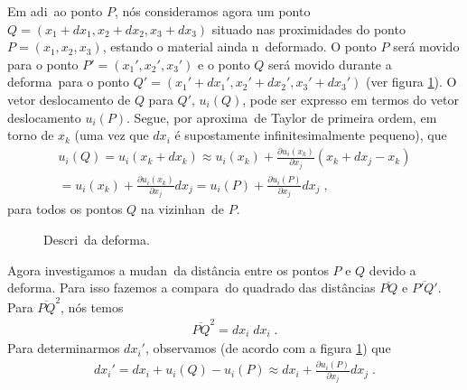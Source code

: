 Em adi\cao\ ao ponto $P$, n\'os consideramos agora um ponto
$Q=(x_1+dx_1,x_2+dx_2,x_3+dx_3)$ situado nas proximidades do
ponto $P=(x_1,x_2,x_3)$, estando o material ainda n\ao\ deformado. O
ponto $P$ ser\'a movido para o ponto $P'=(x_1',x_2',x_3')$ e o ponto
$Q$ ser\'a movido durante a deforma\cao\ para o ponto
$Q'=(x_1'+dx_1',x_2'+dx_2',x_3'+dx_3')$ (ver figura \ref{fig:tensor-deformacao}). O vetor
deslocamento de $Q$ para $Q'$, $u_i(Q)$, pode ser expresso em termos do
vetor deslocamento $u_i(P)$. Segue, por aproxima\cao\ de Taylor de
primeira ordem, em torno de $x_k$ (uma vez que $dx_i$ \'e supostamente infinitesimalmente
pequeno), que
\begin{eqnarray} \label{vdq}
u_i(Q) = u_i(x_k+dx_k) \approx u_i(x_k) +
\frac{\partial u_i(x_k)}
{\partial x_j} (x_k + dx_j - x_k) \nonumber \\
 = u_i(x_k) +\frac{\partial u_i(x_k)}
{\partial x_j} dx_j = u_i(P) + \frac{\partial u_i(P)}
{\partial x_j} dx_j \; ,
\end{eqnarray}
para todos os pontos $Q$ na vizinhan\ca\ de $P$.

\begin{figure}[h!]
\centering
{}
\caption{Descri\cao\ da deforma\cao.}
\label{fig:tensor-deformacao}
\end{figure}

Agora investigamos a mudan\ca\ da dist\^ancia entre os pontos
$P$ e $Q$ devido a deforma\cao. Para isso fazemos a
compara\cao\ do quadrado das dist\^ancias $\overline{PQ}$
e $\overline{P'Q'}$.
Para $\overline{PQ}^2$, n\'os temos
\begin{eqnarray}
\overline{PQ}^2 = dx_i \; dx_i \; .
\end{eqnarray}
Para determinarmos $dx_i'$, observamos (de acordo com a figura \ref{fig:tensor-deformacao}) que
\begin{eqnarray}
dx_i' = dx_i + u_i(Q) - u_i(P) \approx dx_i +
\frac{\partial u_i(P)}{\partial x_j} dx_j \; .
\label{dxidxi}
\end{eqnarray}

